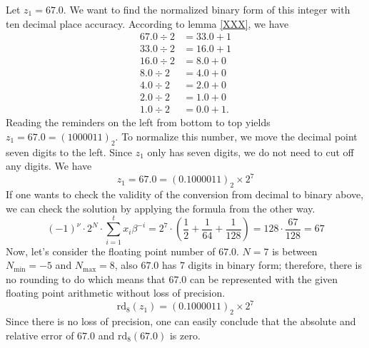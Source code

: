 \begin{exmp}
    Let \(z_1 = 67.0\). We want to find the normalized binary form of this integer with ten decimal place accuracy. According to lemma \ref{XXX}, we have
    \begin{align*}
        67.0 \div 2 &= 33.0 + 1 \\
        33.0 \div 2 &= 16.0 + 1 \\
        16.0 \div 2 &= 8.0 + 0 \\
        8.0 \div 2 &= 4.0 + 0 \\
        4.0 \div 2 &= 2.0 + 0 \\
        2.0 \div 2 &= 1.0 + 0 \\
        1.0 \div 2 &= 0.0 + 1 \text{.}
    \end{align*}
    Reading the reminders on the left from bottom to top yields \(z_1 = 67.0 = (1000011)_2\). To normalize this number, we move the decimal point seven digits to the left. Since \(z_1\) only has seven digits, we do not need to cut off any digits. We have
    \begin{equation*}
        z_1 = 67.0 = (0.1000011)_2 \times 2^7
    \end{equation*}
    If one wants to check the validity of the conversion from decimal to binary above, we can check the solution by applying the formula from the other way.
    \begin{equation*}
        (-1)^{\nu} \cdot 2^N \cdot \sum_{i=1}^{t}x_i \beta^{-i} = 2^7 \cdot \left(\frac{1}{2} + \frac{1}{64} + \frac{1}{128}\right) = 128 \cdot \frac{67}{128} = 67
    \end{equation*}
    Now, let's consider the floating point number of \(67.0\). \(N = 7\) is between \(N_{\text{min}} = -5\) and \(N_{\text{max}} = 8\), also \(67.0\) has 7 digits in binary form; therefore, there is no rounding to do which means that \(67.0\) can be represented with the given floating point arithmetic without loss of precision.
    \begin{equation*}
        \text{rd}_8(z_1) = (0.1000011)_2 \times 2^7
    \end{equation*}
    Since there is no loss of precision, one can easily conclude that the absolute and relative error of \(67.0\) and \(\text{rd}_8(67.0)\) is zero.
\end{exmp}
%
%
